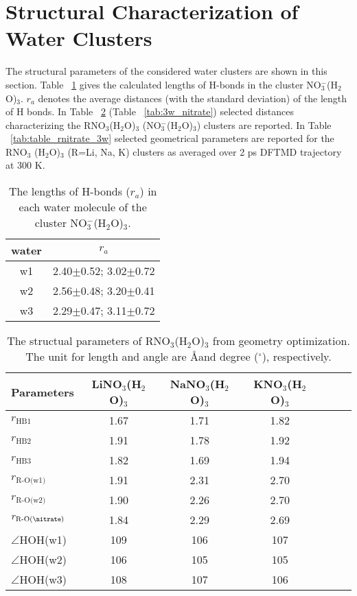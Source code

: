  \section{Structural Characterization of Water Clusters}
 The structural parameters of the considered water clusters are shown in this section.
Table ~\ref{tab:3_nitrate_bond} gives the calculated lengths of H-bonds in the cluster NO$_3^-$(H$_2$O)$_3$. $r_a$ denotes the average distances (with the standard deviation) of the length of H bonds. 
 In Table ~\ref{tab:table_geo_opt} (Table ~\ref{tab:3w_nitrate}) selected distances characterizing 
 the RNO$_3$(H$_2$O)$_3$ (NO$_3^-$(H$_2$O)$_3$) clusters are reported.
 In Table ~\ref{tab:table_rnitrate_3w} selected geometrical parameters are reported for the RNO$_3$   
 (H$_2$O)$_3$ (R=Li, Na, K) clusters as averaged over 2 ps DFTMD trajectory at 300 K.
% 
\begin{table}[!h]
\centering
\caption{\label{tab:3_nitrate_bond}%
  The lengths of H-bonds ($r_a$) in each water molecule of the cluster NO$_3^-$(H$_2$O)$_3$.} 
\begin{tabular}{cc} \\\toprule
 water & \multicolumn{1}{c}{ $r_a$}(\A)\\
\hline
 w1 &2.40$\pm$0.52; 3.02$\pm$0.72 \\
 w2 &2.56$\pm$0.48; 3.20$\pm$0.41 \\
 w3 &2.29$\pm$0.47; 3.11$\pm$0.72
\end{tabular}
\end{table}
%
\begin{table}[!htbp]
\centering
\caption{\label{tab:table_geo_opt}%
The structual parameters of RNO$_3$(H$_2$O)$_3$ from geometry optimization. 
The unit for length and angle are \AA and degree ($^\circ$), respectively.}
\begin{tabular}{l*{4}ccc}
Parameters  & LiNO$_3$(H$_2$O)$_3$& NaNO$_3$(H$_2$O)$_3$ & KNO$_3$(H$_2$O)$_3$\\
\hline
$r_\text{HB1}$& 1.67 & 1.71 & 1.82 \\
$r_\text{HB2}$& 1.91 & 1.78 & 1.92\\
$r_\text{HB3}$& 1.82 & 1.69 & 1.94\\
$r_\text{R-O(w1)}$ & 1.91 & 2.31 & 2.70\\
$r_\text{R-O(w2)}$ & 1.90 & 2.26 & 2.70\\
$r_\text{R-O(\nitrate)}$ & 1.84 & 2.29 & 2.69 \\
$\angle$HOH(w1)& 109 & 106 &107 \\
$\angle$HOH(w2)& 106 & 105&105 \\
$\angle$HOH(w3)& 108 & 107 &106
\end{tabular}
\end{table}
